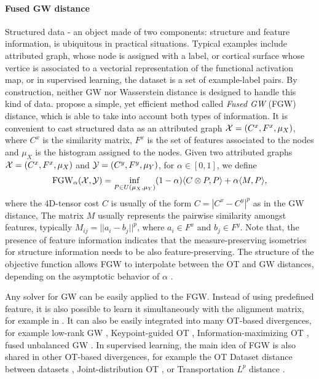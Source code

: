 \paragraph{Fused GW distance} Structured data - an object made of two components:
structure and feature information, is ubiquitous in practical situations.
Typical examples include attributed graph, whose node is assigned with a label, or
cortical surface whose vertice is associated to a vectorial representation of the
functional activation map, or in supervised learning, the dataset is a set of example-label pairs.
By construction, neither GW nor Wasserstein distance is designed to handle this kind of data.
\citep{Vayer19b} propose a simple, yet efficient method called
\textit{Fused GW} (FGW) distance, which is able to take into account both types of information.
It is convenient to cast structured data as an attributed graph $\mathcal X = (C^x, F^x, \mu_X)$,
where $C^x$ is the similarity matrix, $F^x$ is the set of features associated to the nodes and
$\mu_X$ is the histogram assigned to the nodes. Given two attributed graphs
$\mathcal X = (C^x, F^x, \mu_X)$ and $\mathcal Y = (C^y, F^y, \mu_Y)$, for $\alpha \in [0, 1]$, we define
\begin{align}
  \text{FGW}_{\alpha}(\mathcal X, \mathcal Y) = \inf_{P \in U(\mu_X, \mu_Y)}
  (1 - \alpha) \langle C \otimes P, P \rangle + \alpha \langle M, P \rangle,
\end{align}
where the $4$D-tensor cost $C$ is usually of the form $C = |C^x - C^y|^p$ as in the GW distance,
The matrix $M$ usually represents the pairwise similarity amongst features, typically
$M_{ij} = || a_i - b_j||^p$, where $a_i \in F^x$ and $b_j \in F^y$. Note that,
the presence of feature information indicates that the measure-preserving isometries
for structure information needs to be also feature-preserving.
The structure of the objective function allows FGW to interpolate
between the OT and GW distances, depending on the asymptotic behavior of $\alpha$ \citep{Vayer19b}.

Any solver for GW can be easily applied to the FGW. Instead of using predefined feature,
it is also possible to learn it simultaneously with the alignment matrix,
for example in \citep{Xu19}. It can also be easily integrated into many OT-based divergences,
for example low-rank GW \citep{Meyer21b},
Keypoint-guided OT \citep{Gu22}, Information-maximizing OT \citep{Chuang23},
fused unbalanced GW \citep{Thual22}.
In supervised learning, the main idea of FGW is also shared in other OT-based divergences,
for example the OT Dataset distance between datasets \citep{Melis20},
Joint-distribution OT \citep{Courty17}, or Transportation $L^p$ distance \citep{Thorpe17}.

